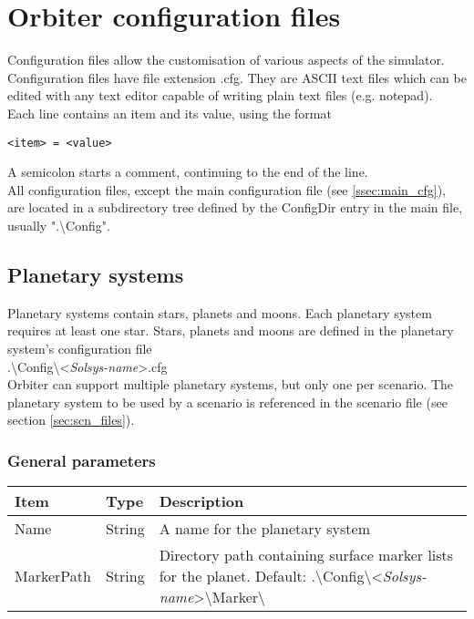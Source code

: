 \documentclass[Orbiter Developer Manual.tex]{subfiles}
\begin{document}
\section{Orbiter configuration files}
Configuration files allow the customisation of various aspects of the simulator. Configuration files have file extension .cfg. They are ASCII text files which can be edited with any text editor capable of writing plain text files (e.g. notepad).\\
Each line contains an item and its value, using the format

\begin{lstlisting}[language=OSFS]
<item> = <value>
\end{lstlisting}

\noindent
A semicolon starts a comment, continuing to the end of the line.\\
All configuration files, except the main configuration file (see \ref{ssec:main_cfg}), are located in a subdirectory tree defined by the ConfigDir entry in the main file, usually ".\textbackslash Config".

\subsection{Planetary systems}
\label{ssec:planetery_sys}
Planetary systems contain stars, planets and moons. Each planetary system requires at least one star. Stars, planets and moons are defined in the planetary system's configuration file\\
\indent .\textbackslash Config\textbackslash <\textit{Solsys-name}>.cfg\\
Orbiter can support multiple planetary systems, but only one per scenario. The planetary system to be used by a scenario is referenced in the scenario file (see section \ref{sec:scn_files}).

\subsubsection*{General parameters}

	\begin{longtable}{ |p{}|p{}|p{}| }
	\hline\rule{0pt}{2ex}
	\textbf{Item} & \textbf{Type} & \textbf{Description}\\
	\hline\rule{0pt}{2ex}
	Name & String & A name for the planetary system\\
	\hline\rule{0pt}{2ex}
	MarkerPath & String & Directory path containing surface marker lists for the planet. Default: .\textbackslash Config\textbackslash <\textit{Solsys-name}>\textbackslash Marker\textbackslash \\
	\hline
	\end{longtable}
\end{document}
